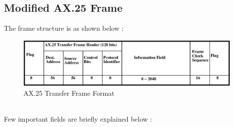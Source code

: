 \documentclass[BTech]{iitmdiss}
\begin{document}
\subsection{Modified AX.25 Frame }
The frame structure is as shown below : 
\newline
\begin{figure}[H]

\includegraphics[scale = 0.65]{ax25main.eps.eps}
\caption{AX.25 Transfer Frame Format}
\label{fig:AX25mainframe}
\end{figure}
\\Few important  fields are briefly explained below :
\end{document}
